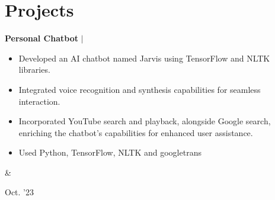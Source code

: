 \documentclass[10pt, letterpaper]{article}
\newenvironment{highlights}{
        \begin{itemize}[
                topsep=0pt,
                parsep=0.10 cm,
                partopsep=0pt,
                itemsep=0pt,
                after=\vspace{-1\baselineskip},
                leftmargin=0.4 cm + 3pt
            ]
    }{
        \end{itemize}
    } %
\let\hrefWithoutArrow\href
\renewcommand{\href}[2]{\hrefWithoutArrow{#1}{\mbox{\ifthenelse{\equal{#2}{}}{ }{#2 }\raisebox{.15ex}{\footnotesize \faExternalLink*}}}}
\let\originalTabularx\tabularx
\let\originalEndTabularx\endtabularx
\renewenvironment{tabularx}{\bgroup\centering\originalTabularx}{\originalEndTabularx\par\egroup}
\begin{document}






    
    \section{Projects}

        \begin{tabularx}{
            \textwidth-0.4 cm-0.13cm
        }{
            K{0.2 cm}
            R{4.1 cm}
        }
           \textbf{Personal Chatbot} $|$  \href{https://github.com/09hritik/jarvis}{\raisebox{-0.2\height}\faGithub\ }

            \vspace{0.10 cm}

            \begin{highlights}
                \item 
                    Developed an AI chatbot named Jarvis using TensorFlow and NLTK libraries.
                \item 
                    Integrated voice recognition and synthesis capabilities for seamless interaction.

                \item 
                    Incorporated YouTube search and playback, alongside Google search, enriching the chatbot's capabilities for enhanced user assistance.


                \item Used Python,  TensorFlow, NLTK and googletrans
            \end{highlights}
            &
            

            Oct.  '23
        \end{tabularx}
\end{document}
